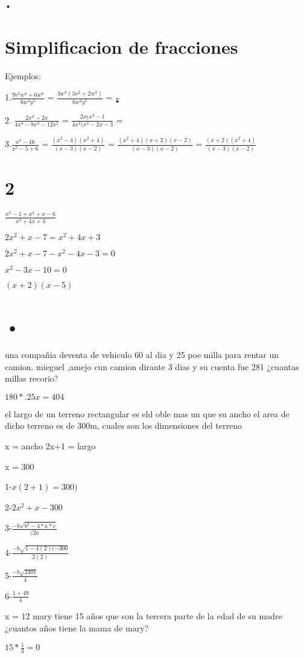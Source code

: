 \documentclass[10pt,a4paper]{book}
\author{Allen Josue Zuñiga Aldape}
\begin{document}
•


\section{Simplificacion de fracciones}
Ejemplos:

1.$\frac{9v^2w^3+6w^6}{6w^4y^5}$ = $\frac{3w^3(3v^2+2w^3)}{6w^4y^5}$ = $\frac{}{•}$




2. $\frac{2x^3-2x}{4x^4-8x^3-12x^2}$ = $\frac{2x(x^2-1}{4x^2(x^2-2x-3}$ = 



3.$\frac{x^4-16}{x^2-5+6}$ = $\frac{(x^2-4)(x^2+4)}{(x-3)(x-2)}$ = $\frac{(x^2+4)(x+2)(x-2)}{(x-3)(x-2)}$ = $\frac{(x+2)(x^2+4)}{(x-3)(x-2)}$


\section{2}
$\frac{x^2-1+x^2+x-6}{x^2+4x+3}$

$2x^2+x-7=x^2+4x+3$

$2x^2+x-7-x^2-4x-3=0$

$x^2-3x-10=0$

$(x+2)(x-5)$

\section{•}
una compañia deventa de vehiculo 60 al dia y 25 poe milla para rentar un camion. mieguel ,amejo cun camion dirante 3 dias y su cuenta fue 281 ¿cuantas millas recorio?

$180 * .25x =  404$

el largo de un terreno rectangular es eld oble mas un que su ancho el area de dicho terreno es de 300m, cuales son los dimensiones del terreno

x = ancho
2x+1 = largo

x = 300

1-$x(2+1)=300)$

2-$2x^2+x-300$

3-$\frac{-b\sqrt{b^2 -4*a*c}}{/2a}$

4-$\frac{-b\sqrt{1 -4(2)(-300}}{2(2)}$

5-$\frac{-b\sqrt{2401}}{4}$

6-$\frac{1+49}{4}$

x = 12
\newpage
mary tiene 15 años que son la tercera parte de la edad de su madre ¿cuantos años tiene la mama de mary?

$15 * \frac{1}{3} = 0$
\end{document}
